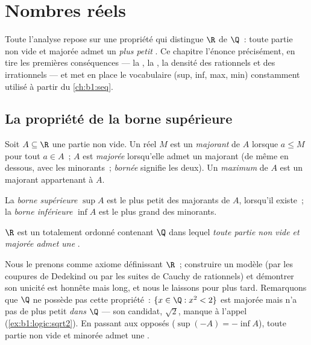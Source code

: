 \chapter{Nombres réels}\label{ch:b1:reals}

Toute l'analyse repose sur une propriété qui distingue $\R$ de
$\Q$~: toute partie non vide et majorée admet un \emph{plus petit}
. Ce chapitre l'énonce précisément, en tire les premières
conséquences --- la , la , la densité des rationnels et des irrationnels --- et met en
place le vocabulaire (sup, inf, max, min) constamment utilisé à
partir du \cref{ch:b1:seq}.

\section{La propriété de la borne supérieure}

\begin{definition}\label{def:b1:reals:bounds}
Soit $A \subseteq \R$ une partie non vide. Un réel $M$ est un
\emph{majorant} de $A$ lorsque $a \leq M$ pour tout
$a \in A$~; $A$ est \emph{majorée} lorsqu'elle admet un majorant (de
même en dessous, avec les minorants~; \emph{bornée} signifie les
deux). Un \emph{maximum} de $A$ est un majorant appartenant à $A$.

La \emph{borne supérieure} $\sup A$ est le
plus petit des majorants de $A$, lorsqu'il existe~; la \emph{borne
inférieure} $\inf A$ est le plus grand des
minorants.
\end{definition}

\begin{theorem}\label{thm:b1:reals:sup}
$\R$ est un  totalement ordonné contenant $\Q$ dans lequel
\emph{toute partie non vide et majorée admet une }.
\end{theorem}
\admitted

\begin{remark}
Nous le prenons comme axiome définissant $\R$~; construire un modèle
(par les coupures de Dedekind ou par les suites de Cauchy de
rationnels) et démontrer son unicité est honnête mais long, et nous
le laissons pour plus tard. Remarquons que $\Q$ ne possède pas cette
propriété~: $\{x \in \Q : x^2 < 2\}$ est majorée mais n'a pas de plus
petit  \emph{dans $\Q$} --- son candidat, $\sqrt 2$, manque à
l'appel (\cref{ex:b1:logic:sqrt2}). En passant aux opposés
($\sup(-A) = -\inf A$), toute partie non vide et minorée admet une
.
\end{remark}

